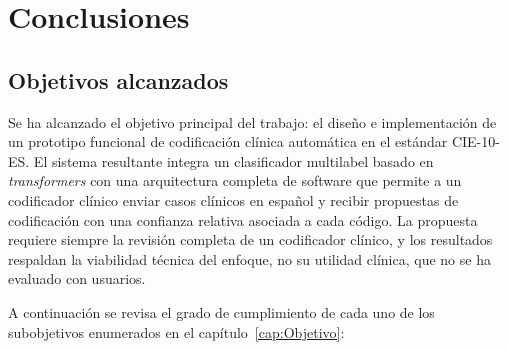 \chapter{Conclusiones}
\label{cap:Conclusiones}

\section{Objetivos alcanzados}

Se ha alcanzado el objetivo principal del trabajo: el diseño e implementación de un prototipo funcional de codificación clínica automática en el estándar CIE-10-ES. El sistema resultante integra un clasificador multilabel basado en \emph{transformers} con una arquitectura completa de software que permite a un codificador clínico enviar casos clínicos en español y recibir propuestas de codificación con una confianza relativa asociada a cada código. La propuesta requiere siempre la revisión completa de un codificador clínico, y los resultados respaldan la viabilidad técnica del enfoque, no su utilidad clínica, que no se ha evaluado con usuarios.

A continuación se revisa el grado de cumplimiento de cada uno de los subobjetivos enumerados en el capítulo~\ref{cap:Objetivo}:

